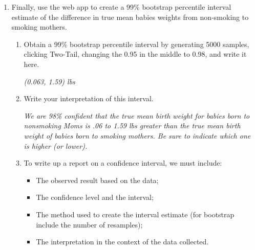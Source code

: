 \begin{enumerate}
\item Finally, use the web app to create a 99\% bootstrap percentile
  interval estimate of the  difference in true mean babies weights
  from non-smoking to smoking mothers.  
  \begin{enumerate}

\item Obtain a 99\% bootstrap percentile interval by generating 5000
  samples, clicking {\sf Two-Tail}, changing the 0.95 in the middle to
  0.98, and write it here.
\begin{students}
    \vspace{2cm}    
\end{students}

\begin{key}
  {\it (0.063, 1.59) lbs  }
\end{key}
    \item Write your interpretation of this interval.
\begin{students}
    \vfill
\end{students}

\begin{key}
  {\it  We are 98\% confident that the true mean birth weight for
    babies born to nonsmoking Moms is   .06 to 1.59 lbs greater than 
   the true mean birth weight of babies born to smoking mothers. Be
   sure to indicate which one is higher  (or lower). } 
\end{key}


\item To write up a report on a confidence interval, we must include:
  \begin{itemize}
  \item The observed result based on the data;
  \item The confidence level and the interval;
  \item The method used to create the interval estimate (for
        bootstrap include the number of resamples);
  \item The interpretation in the context of the data collected.
\end{itemize}
\end{enumerate}
\end{enumerate}

\begin{students}
  \newpage
\end{students}

